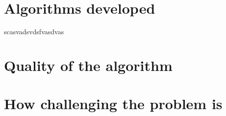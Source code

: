 \chapter{Algorithms developed}
scasvadsvdsfvasdvas
\chapter{Quality of the algorithm}
\chapter{How challenging the problem is}